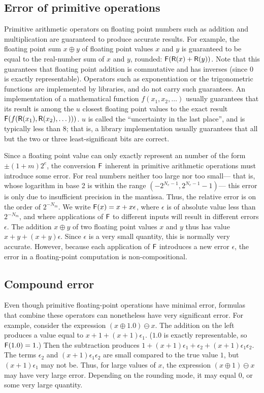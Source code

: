 \documentclass[paper.tex]{subfiles}
\begin{document}
\subsection{Error of primitive operations}

Primitive arithmetic operators on floating point numbers
  such as addition and multiplication
  are guaranteed to produce accurate results.
For example, the floating point sum
  $x \oplus y$ of floating point values $x$ and $y$
  is guaranteed to be equal to the real-number sum
  of $x$ and $y$, rounded: $\mathsf{F}(\mathsf{R}(x) + \mathsf{R}(y))$.
Note that this guarantees that floating point addition
  is commutative and has inverses (since $0$ is exactly representable).
Operators such as exponentiation or the trigonometric functions
  are implemented by libraries, and do not carry such guarantees.
An implementation of a mathematical function $f(x_1, x_2, \dotsc)$
  usually guarantees that its result
  is among the $u$ closest floating point values
  to the exact result $\mathsf{F}(f(\mathsf{R}(x_1), \mathsf{R}(x_2), \dotsc)))$.
$u$ is called the ``uncertainty in the last place'',
  and is typically less than 8; that is,
  a library implementation usually guarantees that all
  but the two or three least-significant bits are correct.

Since a floating point value can only exactly represent
  an number of the form $\pm(1 + m) 2^e$,
  the conversion $\mathsf{F}$ inherent in primitive arithmetic operations
  must introduce some error.
For real numbers neither too large nor too small---%
  that is, whose logarithm in base 2 is within the range
  $(-2^{N_e-1}, 2^{N_e-1} - 1)$---%
  this error is only due to insufficient precision in the mantissa.
Thus, the relative error is on the order of $2^{-N_m}$.
We write $\mathsf{F}(x) = x + x\epsilon$,
  where $\epsilon$ is of absolute value less than $2^{-N_m}$,
  and where applications of $\mathsf{F}$ to different inputs
  will result in different errors $\epsilon$.
The addition $x \oplus y$ of two floating point values $x$ and $y$
  thus has value $x + y + (x + y)\epsilon$.
Since $\epsilon$ is a very small quantity,
  this is normally very accurate.
However, because each application of $\mathsf{F}$
  introduces a new error $\epsilon$,
  the error in a floating-point computation is non-compositional.

\subsection{Compound error}

Even though primitive floating-point operations have minimal error,
  formulas that combine these operators can nonetheless
  have very significant error.
For example, consider the expression $(x \oplus 1.0) \ominus x$.
The addition on the left produces a value equal to
  $x + 1 + (x + 1)\epsilon_1$.
($1.0$ is exactly representable, so $\mathsf{F}(1.0) = 1$.)
Then the subtraction produces
  $1 + (x + 1) \epsilon_1 + \epsilon_2  + (x + 1) \epsilon_1 \epsilon_2$.
The terms $\epsilon_2$ and $(x+1)\epsilon_1\epsilon_2$ are small
  compared to the true value $1$,
  but $(x + 1) \epsilon_1$ may not be.
Thus, for large values of $x$,
  the expression $(x \oplus 1) \ominus x$ may have very large error.
Depending on the rounding mode, it may equal $0$,
  or some very large quantity.
\end{document}
